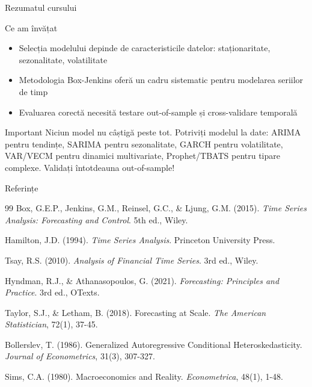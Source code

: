 \documentclass[9pt, aspectratio=169, t]{beamer}
\begin{document}
\begin{frame}{Rezumatul cursului}
\begin{block}{Ce am învățat}
\begin{itemize}
    \item Selecția modelului depinde de caracteristicile datelor: staționaritate, sezonalitate, volatilitate
    \item Metodologia Box-Jenkins oferă un cadru sistematic pentru modelarea seriilor de timp
    \item Evaluarea corectă necesită testare out-of-sample și cross-validare temporală
\end{itemize}
\end{block}

\begin{alertblock}{Important}
Niciun model nu câștigă peste tot. Potriviți modelul la date: ARIMA pentru tendințe, SARIMA pentru sezonalitate, GARCH pentru volatilitate, VAR/VECM pentru dinamici multivariate, Prophet/TBATS pentru tipare complexe. Validați întotdeauna out-of-sample!
\end{alertblock}
\end{frame}

\begin{frame}{Referințe}
    \footnotesize
    \begin{thebibliography}{99}
         Box, G.E.P., Jenkins, G.M., Reinsel, G.C., \& Ljung, G.M. (2015). \textit{Time Series Analysis: Forecasting and Control}. 5th ed., Wiley.

         Hamilton, J.D. (1994). \textit{Time Series Analysis}. Princeton University Press.

         Tsay, R.S. (2010). \textit{Analysis of Financial Time Series}. 3rd ed., Wiley.

         Hyndman, R.J., \& Athanasopoulos, G. (2021). \textit{Forecasting: Principles and Practice}. 3rd ed., OTexts.

         Taylor, S.J., \& Letham, B. (2018). Forecasting at Scale. \textit{The American Statistician}, 72(1), 37-45.

         Bollerslev, T. (1986). Generalized Autoregressive Conditional Heteroskedasticity. \textit{Journal of Econometrics}, 31(3), 307-327.

         Sims, C.A. (1980). Macroeconomics and Reality. \textit{Econometrica}, 48(1), 1-48.
    \end{thebibliography}
\end{frame}
\end{document}
